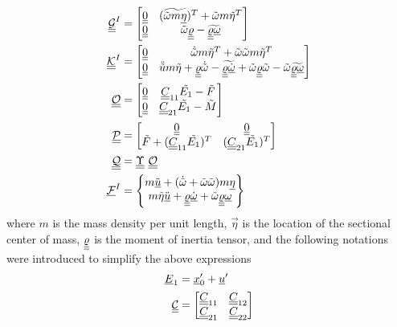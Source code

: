 \begin{align}
        \label{mathcalG}
        \underline{\underline{\mathcal{G}}}^I &= \begin{bmatrix}
        \underline{\underline{0}} & (\widetilde{\tilde{\omega} m \underline{\eta}})^T+\tilde{\omega} m \tilde{\eta}^T  \\
        \underline{\underline{0}} & \tilde{\omega} \underline{\underline{\varrho}}-\widetilde{\underline{\underline{\varrho}} \underline{\omega}}
        \end{bmatrix} \\
        \label{mathcalK}
        \underline{\underline{\mathcal{K}}}^I &= \begin{bmatrix}
        \underline{\underline{0}} & \dot{\tilde{\omega}}m\tilde{\eta}^T + \tilde{\omega} \tilde{\omega}m\tilde{\eta}^T  \\
        \underline{\underline{0}} & \ddot{\tilde{u}}m\tilde{\eta} + \underline{\underline{\varrho}} \dot{\tilde{\omega}}-\widetilde{\underline{\underline{\varrho}} \underline{\dot{\omega}}}+\tilde{\omega} \underline{\underline{\varrho}} \tilde{\omega} - \tilde{\omega}  \widetilde{\underline{\underline{\varrho}} \underline{\omega}}
        \end{bmatrix}\\
	\label{mathcalO}
	\mathcal{\underline{\underline{O}}} &= \begin{bmatrix}
	\underline{\underline{0}} & \underline{\underline{C}}_{11} \tilde{E_1} - \tilde{F} \\
	\underline{\underline{0}}& \underline{\underline{C}}_{21} \tilde{E_1} - \tilde{M}
	\end{bmatrix} \\
	\label{mathcalP}
	\mathcal{\underline{\underline{P}}} &= \begin{bmatrix}
	\underline{\underline{0}} & \underline{\underline{0}} \\
	\tilde{F} +  (\underline{\underline{C}}_{11} \tilde{E_1})^T & (\underline{\underline{C}}_{21} \tilde{E_1})^T
	\end{bmatrix}  \\
	\label{mathcalQ}
	\mathcal{\underline{\underline{Q}}} &= \underline{\underline{\Upsilon}}~ \mathcal{\underline{\underline{O}}} \\
	\label{mathcalF}
	\underline{\mathcal{F}}^I &= \begin{Bmatrix}
	m \ddot{\underline{u}} + (\dot{\tilde{\omega}} + \tilde{\omega} \tilde{\omega})m \underline{\eta} \\
	m \tilde{\eta} \ddot{\underline{u}} +\underline{\underline{\varrho}}\dot{\underline{\omega}}+\tilde{\omega}\underline{\underline{\varrho}}\underline{\omega}
	\end{Bmatrix}
\end{align}
where $m$ is the mass density per unit length, $\vec{\eta}$ is the location of the sectional center of mass, $\underline{\underline{\varrho}}$ is the moment of inertia tensor, and the following notations were introduced to simplify the above expressions
\begin{align}
    \label{E1}
    \underline{E}_1 &= \underline{x}_0^\prime + \underline{u}^\prime \\
    \label{PartC}
    \underline{\underline{\mathcal{C}}} &= \begin{bmatrix}
    \underline{\underline{C}}_{11} & \underline{\underline{C}}_{12} \\
    \underline{\underline{C}}_{21} & \underline{\underline{C}}_{22}
    \end{bmatrix}
\end{align} 

